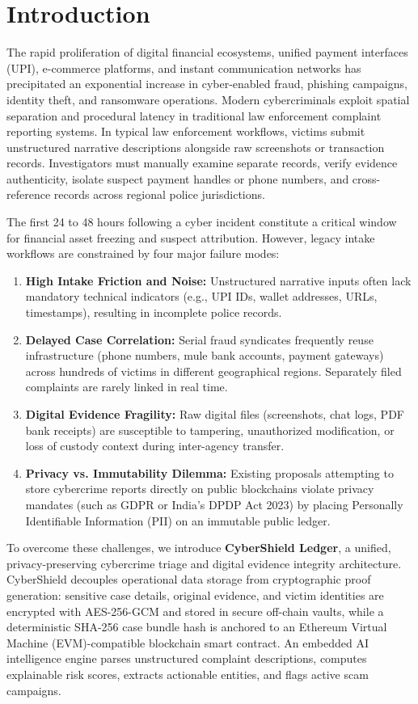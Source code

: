 \documentclass[conference]{IEEEtran}
\begin{document}
\section{Introduction}
The rapid proliferation of digital financial ecosystems, unified payment interfaces (UPI), e-commerce platforms, and instant communication networks has precipitated an exponential increase in cyber-enabled fraud, phishing campaigns, identity theft, and ransomware operations. Modern cybercriminals exploit spatial separation and procedural latency in traditional law enforcement complaint reporting systems. In typical law enforcement workflows, victims submit unstructured narrative descriptions alongside raw screenshots or transaction records. Investigators must manually examine separate records, verify evidence authenticity, isolate suspect payment handles or phone numbers, and cross-reference records across regional police jurisdictions.

The first 24 to 48 hours following a cyber incident constitute a critical window for financial asset freezing and suspect attribution. However, legacy intake workflows are constrained by four major failure modes:
\begin{enumerate}
    \item \textbf{High Intake Friction and Noise:} Unstructured narrative inputs often lack mandatory technical indicators (e.g., UPI IDs, wallet addresses, URLs, timestamps), resulting in incomplete police records.
    \item \textbf{Delayed Case Correlation:} Serial fraud syndicates frequently reuse infrastructure (phone numbers, mule bank accounts, payment gateways) across hundreds of victims in different geographical regions. Separately filed complaints are rarely linked in real time.
    \item \textbf{Digital Evidence Fragility:} Raw digital files (screenshots, chat logs, PDF bank receipts) are susceptible to tampering, unauthorized modification, or loss of custody context during inter-agency transfer.
    \item \textbf{Privacy vs. Immutability Dilemma:} Existing proposals attempting to store cybercrime reports directly on public blockchains violate privacy mandates (such as GDPR or India's DPDP Act 2023) by placing Personally Identifiable Information (PII) on an immutable public ledger.
\end{enumerate}

To overcome these challenges, we introduce \textbf{CyberShield Ledger}, a unified, privacy-preserving cybercrime triage and digital evidence integrity architecture. CyberShield decouples operational data storage from cryptographic proof generation: sensitive case details, original evidence, and victim identities are encrypted with AES-256-GCM and stored in secure off-chain vaults, while a deterministic SHA-256 case bundle hash is anchored to an Ethereum Virtual Machine (EVM)-compatible blockchain smart contract. An embedded AI intelligence engine parses unstructured complaint descriptions, computes explainable risk scores, extracts actionable entities, and flags active scam campaigns.
\end{document}
